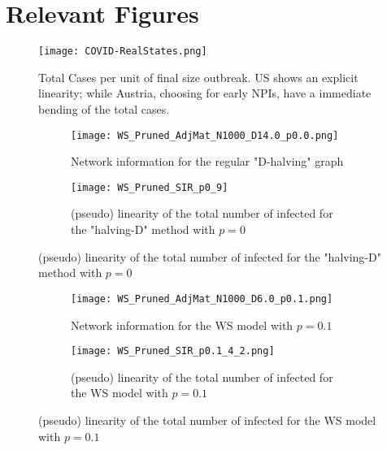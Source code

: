 \documentclass[11pt, a4paper, twoside]{article}
\begin{document}
\section{Relevant Figures}
\begin{figure}[ht]
	\centering
	\texttt{[image: COVID-RealStates.png]}
	\caption{Total Cases per unit of final size outbreak. US shows an explicit linearity; while Austria, choosing for early NPIs, have a immediate bending of the total cases.}
	\label{fig:realstates_linearity}
\end{figure}
\begin{figure}[t]
	\begin{subfigure}{0.45\textwidth}
		\texttt{[image: WS\_Pruned\_AdjMat\_N1000\_D14.0\_p0.0.png]}
		\centering
		\caption{Network information for the regular "D-halving" graph}
		\label{fig::adjmat_pruning_p0.0}
	\end{subfigure}
	\begin{subfigure}{0.45\textwidth}
		\texttt{[image: WS\_Pruned\_SIR\_p0\_9]}
		\caption{(pseudo) linearity of the total number of infected for the "halving-D" method with $p = 0$}
		\label{fig::pruning_p0.0}
	\end{subfigure}
	\end{figure}
	
	\begin{figure}[ht]
		\begin{subfigure}{0.45\textwidth}
			\texttt{[image: WS\_Pruned\_AdjMat\_N1000\_D6.0\_p0.1.png]}
			\centering
			\caption{Network information for the WS model with $p = 0.1$}
			\label{fig::adjmat_pruning_p0.1}
		\end{subfigure}
		\hfill
		\begin{subfigure}{0.45\textwidth}
			\texttt{[image: WS\_Pruned\_SIR\_p0.1\_4\_2.png]}
			\caption{(pseudo) linearity of the total number of infected for the WS model with $p = 0.1$}
			\label{fig::pruning_p0.1}
		\end{subfigure}
	\end{figure}
	
\end{document}
